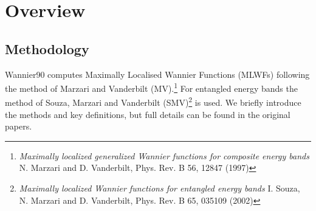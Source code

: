 \chapter{Overview}

\section{Methodology}
Wannier90 computes Maximally Localised
Wannier Functions (MLWFs) following the method of Marzari and Vanderbilt (MV).\footnote{
{\it Maximally localized generalized Wannier functions for composite energy bands}
N. Marzari and D. Vanderbilt, Phys. Rev. B 56, 12847 (1997)}
For entangled energy bands  the method of
Souza, Marzari and Vanderbilt (SMV)\footnote{{\it Maximally localized
    Wannier functions for entangled energy bands} 
I. Souza, N. Marzari and D. Vanderbilt, Phys. Rev. B 65, 035109 (2002)}
is used.
We briefly introduce the methods and key definitions, but full details
can be found in the original papers. 

